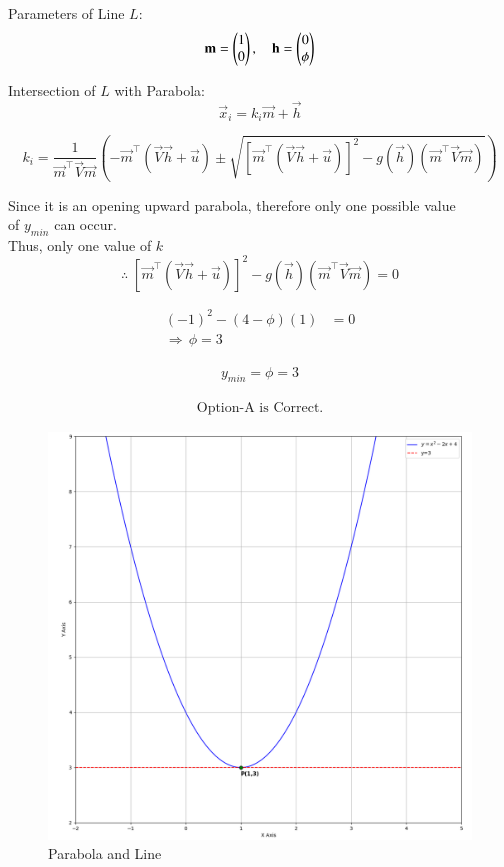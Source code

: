 \documentclass[journal]{IEEEtran}
\begin{document}
Parameters of Line $L$:
\begin{equation}
\mathbf{m}= \begin{pmatrix}1 \\ 0\end{pmatrix}, \quad \mathbf{h} = \begin{pmatrix}0 \\ \phi\end{pmatrix}    
\end{equation}

Intersection of $L$ with Parabola:
\begin{equation}
    \vec{x}_i = k_i\vec{m} + \vec{h}
\end{equation}

\begin{equation}
    k_i = \dfrac{1}{\vec{m}^\top\vec{V}\vec{m}}\left( -\vec{m}^\top(\vec{V}\vec{h}+\vec{u})\pm \sqrt{[\vec{m}^\top(\vec{V}\vec{h}+\vec{u})]^2 - g(\vec{h})(\vec{m}^\top\vec{V}\vec{m})} \right)
\end{equation}

\newpage

Since it is an opening upward parabola, therefore only one possible value\\
of $y_{min}$ can occur.\\
Thus, only one value of $k$
\begin{equation}
    \therefore \; [\vec{m}^\top(\vec{V}\vec{h}+\vec{u})]^2 - g(\vec{h})(\vec{m}^\top\vec{V}\vec{m}) = 0
\end{equation}

\begin{align}
    (-1)^2 - (4-\phi)(1) &= 0 \\
  \Rightarrow \, \boxed{\phi = 3}
\end{align}

\begin{align}
y_{min} = \phi = 3    
\end{align}

\begin{align*}
    \boxed{\text{Option-A is Correct.}}
\end{align*}

\begin{figure}
    \centering
    \includegraphics[width=\columnwidth]{figs/fig1.png}
    \caption{Parabola and Line}
    \label{fig:figs/fig1.png}
\end{figure}
\end{document}
